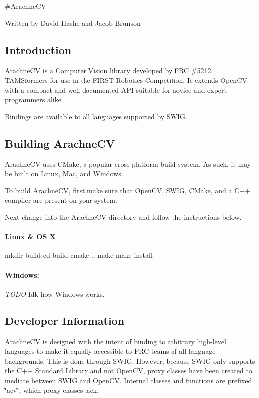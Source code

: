 \#\-Arachne\-C\-V

Written by David Hashe and Jacob Brunson

\subsection*{Introduction}

Arachne\-C\-V is a Computer Vision library developed by F\-R\-C \#5212 T\-A\-M\-Sformers for use in the F\-I\-R\-S\-T Robotics Competition. It extends Open\-C\-V with a compact and well-\/documented A\-P\-I suitable for novice and expert programmers alike.

Bindings are available to all languages supported by S\-W\-I\-G.

\subsection*{Building Arachne\-C\-V}

Arachne\-C\-V uses C\-Make, a popular cross-\/platform build system. As such, it may be built on Linux, Mac, and Windows.

To build Arachne\-C\-V, first make sure that Open\-C\-V, S\-W\-I\-G, C\-Make, and a C++ compiler are present on your system.

Next change into the Arachne\-C\-V directory and follow the instructions below.

\paragraph*{Linux \& O\-S X}

\begin{DoxyVerb}mkdir build
cd build
cmake ..
make
make install
\end{DoxyVerb}


\paragraph*{Windows\-:}

{\itshape T\-O\-D\-O} Idk how Windows works.

\subsection*{Developer Information}

Arachne\-C\-V is designed with the intent of binding to arbitrary high-\/level languages to make it equally accessible to F\-R\-C teams of all language backgrounds. This is done through S\-W\-I\-G. However, because S\-W\-I\-G only supports the C++ Standard Library and not Open\-C\-V, proxy classes have been created to mediate between S\-W\-I\-G and Open\-C\-V. Internal classes and functions are prefixed \char`\"{}acv\char`\"{}, which proxy classes lack.

